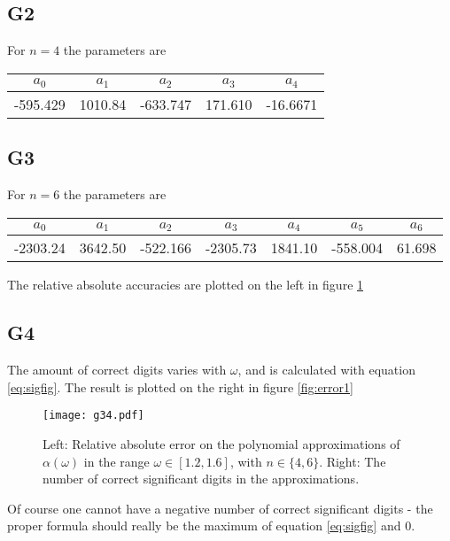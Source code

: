 \documentclass[a4paper,10pt]{article}
\begin{document}
	\subsection*{G2}
	For $ n=4 $ the parameters are
	\begin{table}[H]
		\centering
		\begin{tabular}{c|c|c|c|c}
		$ a_0 $ & $ a_1 $ & $ a_2 $ & $ a_3 $ & $ a_4 $ \\
		\hline
		-595.429 & 1010.84 & -633.747 & 171.610 & -16.6671
	\end{tabular}
	\end{table}
	
	\subsection*{G3}
	For $ n=6 $ the parameters are
	\begin{table}[H]
		\centering
		\begin{tabular}{c|c|c|c|c|c|c}
			$ a_0 $ & $ a_1 $ & $ a_2 $ & $ a_3 $ & $ a_4 $ & $ a_5 $ & $ a_6 $ \\
			\hline
			-2303.24 & 3642.50 & -522.166 & -2305.73 & 1841.10 & -558.004 & 61.698
		\end{tabular}
	\end{table}
	The relative absolute accuracies are plotted on the left in figure \ref{fig:error1}
	
	\subsection*{G4}
	The amount of correct digits varies with $ \omega $, and is calculated with equation \ref{eq:sigfig}. The result is plotted on the right in figure \eqref{fig:error1}
	\begin{figure}[H]
		\centering
		\texttt{[image: g34.pdf]}
		\caption{Left: Relative absolute error on the polynomial approximations of $ \alpha(\omega) $ in the range $ \omega \in [1.2, 1.6] $, with $ n\in \{4, 6\} $. Right: The number of correct significant digits in the approximations.}
		\label{fig:error1}
	\end{figure}
	Of course one cannot have a negative number of correct significant digits - the proper formula should really be the maximum of equation \eqref{eq:sigfig} and 0.
	
	
\end{document}
